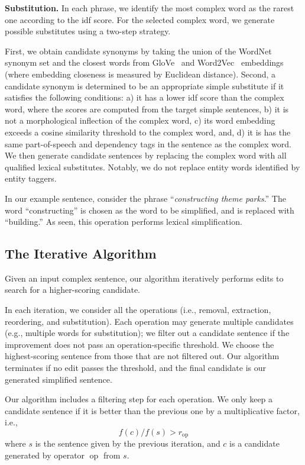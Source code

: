 \documentclass[11pt,a4paper]{article}
\begin{document}
\textbf{Substitution.}
In each phrase, we identify the most complex word as the rarest one according to the idf score. 
For the selected complex word, we generate possible substitutes using a two-step strategy. 


First, we obtain candidate synonyms by taking the union of the WordNet synonym set \cite{miller1995wordnet} and the closest words from GloVe~\cite{pennington2014glove} and Word2Vec~\cite{mikolov2013distributed} embeddings (where embedding closeness is measured by Euclidean distance).  Second, a candidate synonym is determined to be an appropriate simple substitute if it satisfies the following conditions: a) it has a lower idf score than the complex word, where the scores are computed from the target simple sentences, b) it is not a morphological inflection of the complex word, c) its word embedding exceeds a cosine similarity  threshold to the complex word, and, d) it is has the same part-of-speech and dependency tags in the sentence as the complex word. We then generate candidate sentences by replacing the complex word with all qualified lexical substitutes.
Notably, we do not replace entity words identified by entity taggers. 

In our example sentence, consider the phrase ``\textit{constructing theme parks}.'' The word ``constructing'' is chosen as the word to be simplified, and is replaced with ``building.'' As seen, this operation performs lexical simplification.


\subsection{The Iterative Algorithm}
\label{sec:algorithm}

Given an input complex sentence, our algorithm iteratively performs edits to search for a higher-scoring candidate. 

In each iteration, we consider all the operations (i.e., removal, extraction, reordering, and substitution). Each operation may generate multiple candidates (e.g., multiple words for substitution); we filter out a candidate sentence if the improvement does not pass an operation-specific threshold. We choose the highest-scoring sentence from those that are not filtered out. Our algorithm terminates if no edit passes the threshold, and the final candidate is our generated simplified sentence.

Our algorithm includes a filtering step for each operation. We only keep a candidate sentence if it is better than the previous one by a multiplicative factor, i.e., 
\begin{equation}\label{eqn:stop}
{f}(c)/{f}(s) > r_{\operatorname{op}}
\end{equation} where $s$ is the sentence given by the previous iteration, and $c$ is a candidate generated by operator ${\operatorname{op}}$ from $s$.
\end{document}
